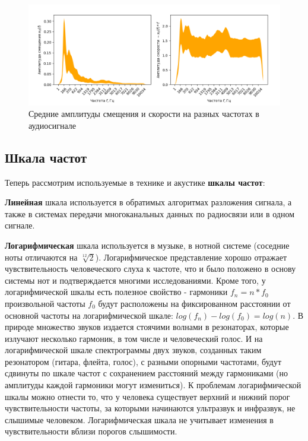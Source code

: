 \begin{figure}
  \centering
  \includegraphics[width=0.9\linewidth]{figures/spectrum_mean}
  \caption{Средние амплитуды смещения и скорости на разных частотах в аудиосигнале}
  \label{fig:spectrum_mean}
\end{figure}


\subsection{Шкала частот}

Теперь рассмотрим используемые в технике и акустике \textbf{шкалы частот}:

\textbf{Линейная} шкала используется в обратимых алгоритмах разложения сигнала, а также в системах передачи многоканальных данных по радиосвязи или в одном сигнале.
  
\textbf{Логарифмическая} шкала используется в музыке, в нотной системе (соседние ноты отличаются на $\sqrt[12]{2}$). 
Логарифмическое представление хорошо отражает чувствительность человеческого слуха к частоте, что и было положено в основу системы нот и подтверждается многими исследованиями.
Кроме того, у логарифмической шкалы есть полезное свойство - гармоники $f_n = n * f_0$ произвольной частоты $f_0$ будут расположены на 
фиксированном расстоянии от основной частоты на логарифмической шкале:
$log(f_n) - log(f_0) = log(n)$. В природе множество звуков издается стоячими волнами в резонаторах, которые излучают несколько гармоник, в том числе и человеческий голос.
И на логарифмической шкале спектрограммы двух звуков, созданных таким резонатором (гитара, флейта, голос), с разными опорными частотами, 
будут сдвинуты по шкале частот с сохранением расстояний между гармониками (но амплитуды каждой гармоники могут измениться). 
К проблемам логарифмической шкалы можно отнести то, что у человека существует верхний и нижний порог чувствительности частоты, 
за которыми начинаются ультразвук и инфразвук, не слышимые человеком. 
Логарифмическая шкала не учитывает изменения в чувствительности вблизи порогов слышимости.

